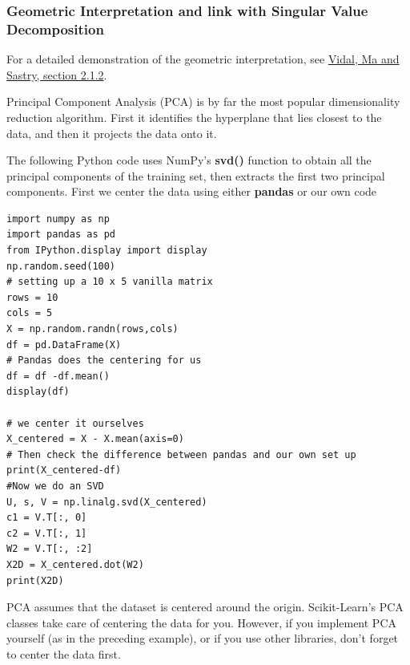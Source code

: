 \documentclass{beamer}
\begin{document}
\begin{frame}
\frametitle{Geometric Interpretation and link with Singular Value Decomposition}

For a detailed demonstration of the geometric interpretation, see \href{{https://www.springer.com/gp/book/9780387878102}}{Vidal, Ma and Sastry, section 2.1.2}.

Principal Component Analysis (PCA) is by far the most popular dimensionality reduction algorithm.
First it identifies the hyperplane that lies closest to the data, and then it projects the data onto it.

The following Python code uses NumPy’s \textbf{svd()} function to obtain all the principal components of the
training set, then extracts the first two principal components. First we center the data using either \textbf{pandas} or our own code

























\begin{verbatim}
import numpy as np
import pandas as pd
from IPython.display import display
np.random.seed(100)
# setting up a 10 x 5 vanilla matrix 
rows = 10
cols = 5
X = np.random.randn(rows,cols)
df = pd.DataFrame(X)
# Pandas does the centering for us
df = df -df.mean()
display(df)

# we center it ourselves
X_centered = X - X.mean(axis=0)
# Then check the difference between pandas and our own set up
print(X_centered-df)
#Now we do an SVD
U, s, V = np.linalg.svd(X_centered)
c1 = V.T[:, 0]
c2 = V.T[:, 1]
W2 = V.T[:, :2]
X2D = X_centered.dot(W2)
print(X2D)

\end{verbatim}


PCA assumes that the dataset is centered around the origin. Scikit-Learn’s PCA classes take care of centering
the data for you. However, if you implement PCA yourself (as in the preceding example), or if you use other libraries, don’t
forget to center the data first.


\end{frame}
\end{document}
